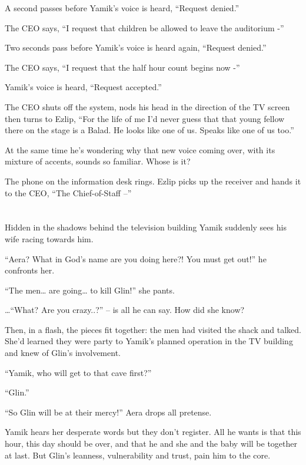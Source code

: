 \documentclass[twoside,11pt]{book}
\begin{document}
A second passes before Yamik's voice is heard, ``Request denied.''

The CEO says, ``I request that children be allowed to leave the auditorium -''

Two seconds pass before Yamik's voice is heard again, ``Request denied.''

The CEO says, ``I request that the half hour count begins now -''

Yamik's voice is heard, ``Request accepted.''

The CEO shuts off the system, nods his head in the direction of the TV screen then turns
to{ }Ezlip, ``For the life of me I'd never guess that that young
fellow there on the stage is a Balad. He looks like one of us. Speaks like one of us too.''

At the same time he's wondering why that new voice coming over,{ }with its
mixture of accents, sounds so familiar. Whose{ }is it?

The phone on the information desk rings. Ezlip picks up the receiver and hands it to the CEO, ``The
Chief-of-Staff --''


\bigskip

\chapter{}

Hidden in the shadows behind the television building Yamik suddenly sees his wife racing towards him.

{}``Aera? What in God's name are you doing here?! You must get out!'' he confronts her.

``The men{\dots} are going{\dots} to kill Glin!'' she pants.

{{\dots}}``What?{ }Are you
crazy..?'' -- is all he can say. How did she know?

Then, in a flash, the pieces fit together: the men had visited the shack and talked. She'd learned they were party to
Yamik's planned operation in the TV building and knew of Glin's involvement.

``Yamik, who will get to that cave first?''

``Glin.''

``So Glin will be at their mercy!'' Aera drops all pretense.

Yamik hears her desperate words but they don't register. All he wants is that this hour, this day should be over, and
that he and she and the baby will be together at last. But Glin's leanness, vulnerability and trust, pain him to the
core{.}
\end{document}
